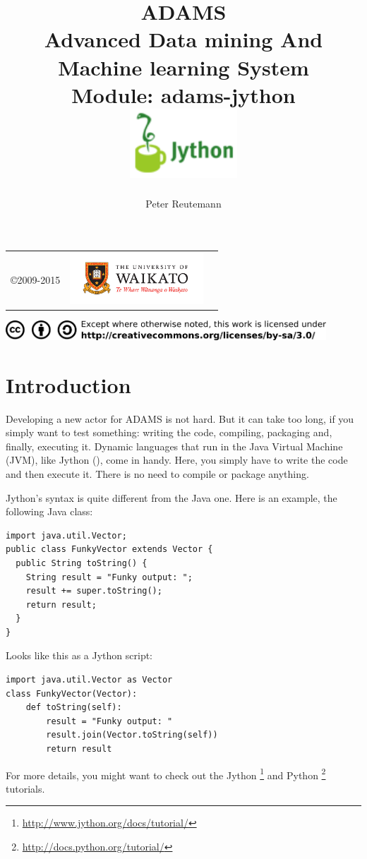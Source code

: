 \documentclass[a4paper]{book}
\title{
  \textbf{ADAMS} \\
  {\Large \textbf{A}dvanced \textbf{D}ata mining \textbf{A}nd \textbf{M}achine
  learning \textbf{S}ystem} \\
  {\Large Module: adams-jython} \\
  \vspace{1cm}
  \includegraphics[width=4cm]{images/jython_logo.png} \\
}
\author{
  Peter Reutemann
}
\begin{document}
\begin{titlepage}
\maketitle

\thispagestyle{empty}
\center
\begin{table}[b]
	\begin{tabular}{c l l}
		\parbox[c][2cm]{2cm}{\copyright 2009-2015} &
		\parbox[c][2cm]{5cm}{\includegraphics[width=5cm]{images/coat_of_arms.pdf}} \\
	\end{tabular}
	\includegraphics[width=12cm]{images/cc.png} \\
\end{table}

\end{titlepage}

\tableofcontents
\listoffigures

\chapter{Introduction}
Developing a new actor for ADAMS is not hard. But it can take too long, if you
simply want to test something: writing the code, compiling, packaging and,
finally, executing it. Dynamic languages that run in the Java Virtual Machine
(JVM), like Jython (\cite{jython}), come in handy. Here, you simply have to
write the code and then execute it. There is no need to compile or package anything.

Jython's syntax is quite different from the Java one. Here is an example, the
following Java class:
\begin{verbatim}
import java.util.Vector;
public class FunkyVector extends Vector {
  public String toString() {
    String result = "Funky output: ";
    result += super.toString();
    return result;
  }
}
\end{verbatim}
Looks like this as a Jython script:
\begin{verbatim}
import java.util.Vector as Vector
class FunkyVector(Vector):
    def toString(self):
        result = "Funky output: "
        result.join(Vector.toString(self))
        return result
\end{verbatim}
For more details, you might want to check out the Jython
\footnote{\url{http://www.jython.org/docs/tutorial/}{}} and Python
\footnote{\url{http://docs.python.org/tutorial/}{}} tutorials.
\end{document}
